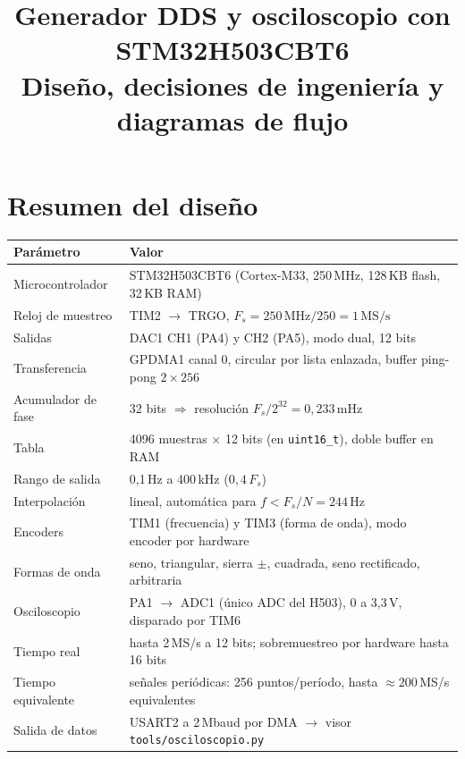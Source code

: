 \documentclass[11pt,a4paper]{article}
\title{\textbf{Generador DDS y osciloscopio con STM32H503CBT6}\\[2mm]
\large Diseño, decisiones de ingeniería y diagramas de flujo}
\author{}
\date{}
\begin{document}
\maketitle
\vspace{-12mm}

\section{Resumen del diseño}

\begin{center}
\begin{tabular}{@{}ll@{}}
\toprule
\textbf{Parámetro} & \textbf{Valor} \\
\midrule
Microcontrolador & STM32H503CBT6 (Cortex-M33, 250\,MHz, 128\,KB flash, 32\,KB RAM) \\
Reloj de muestreo & TIM2 $\rightarrow$ TRGO, $F_s = 250\,\text{MHz}/250 = 1\,\text{MS/s}$ \\
Salidas & DAC1 CH1 (PA4) y CH2 (PA5), modo dual, 12 bits \\
Transferencia & GPDMA1 canal 0, circular por lista enlazada, buffer ping-pong $2\times256$ \\
Acumulador de fase & 32 bits $\Rightarrow$ resolución $F_s/2^{32} = 0{,}233$\,mHz \\
Tabla & 4096 muestras $\times$ 12 bits (en \texttt{uint16\_t}), doble buffer en RAM \\
Rango de salida & 0,1\,Hz a 400\,kHz ($0{,}4\,F_s$) \\
Interpolación & lineal, automática para $f < F_s/N = 244$\,Hz \\
Encoders & TIM1 (frecuencia) y TIM3 (forma de onda), modo encoder por hardware \\
Formas de onda & seno, triangular, sierra $\pm$, cuadrada, seno rectificado, arbitraria \\
\midrule
Osciloscopio & PA1 $\rightarrow$ ADC1 (único ADC del H503), 0 a 3,3\,V, disparado por TIM6 \\
Tiempo real & hasta 2\,MS/s a 12 bits; sobremuestreo por hardware hasta 16 bits \\
Tiempo equivalente & señales periódicas: 256 puntos/período, hasta $\approx 200$\,MS/s equivalentes \\
Salida de datos & USART2 a 2\,Mbaud por DMA $\rightarrow$ visor \texttt{tools/osciloscopio.py} \\
\bottomrule
\end{tabular}
\end{center}
\end{document}
